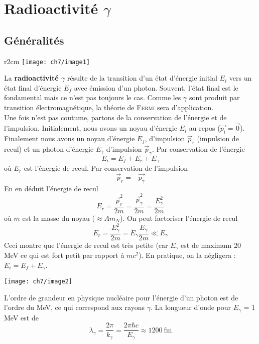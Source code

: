 \chapter{Radioactivité $\gamma$}
\section{Généralités}
	\begin{wrapfigure}[9]{r}{2cm}
	\vspace{-15mm}
	\texttt{[image: ch7/image1]}
	\end{wrapfigure}
La \textbf{radioactivité $\gamma$} résulte de la transition d'un état d'énergie initial $E_i$ vers un état final
d'énergie $E_f$ avec émission d'un photon. Souvent, l'état final est le fondamental mais ce n'est pas toujours
le cas. Comme les $\gamma$ sont produit par transition électromagnétique, la théorie de \textsc{Fermi} sera 
d'application.\\
 
 
Une fois n'est pas coutume, partons de la conservation de l'énergie et de l'impulsion. Initialement, 
nous avons un noyau d'énergie $E_i$ au repos ($\vec{p_i}=\vec 0$). Finalement nous avons un noyau 
d'énergie $E_f$, d'impulsion $\vec p_r$ (impulsion de recul) et un photon d'énergie $E_\gamma$ 
d'impulsion $\vec p_\gamma$. Par conservation de l'énergie
\begin{equation}
E_i = E_f+E_r+E_\gamma
\end{equation}
où $E_r$ est l'énergie de recul. Par conservation de l'impulsion
\begin{equation}
\vec p_r = -\vec{p_\gamma}
\end{equation}
En en déduit l'énergie de recul
\begin{equation}
E_r = \dfrac{\vec p_r^2}{2m} = \dfrac{\vec p_\gamma^2}{2m} = \dfrac{E_\gamma^2}{2m}
\end{equation}
où $m$ est la masse du noyau ($\approx Am_N$). On peut factoriser l'énergie de recul
\begin{equation}
E_r =\dfrac{E_\gamma^2}{2m} = E_\gamma\dfrac{E_\gamma}{2m}\ll E_\gamma
\end{equation}
Ceci montre que l'énergie de recul est très petite (car $E_\gamma$ est de maximum 20 MeV ce qui
est fort petit par rapport à $mc^2$). En pratique, on la négligera : $E_i = E_f+E_\gamma$.
 
\begin{center}
	\texttt{[image: ch7/image2]}
\end{center}
L'ordre de grandeur en physique nucléaire pour l'énergie d'un photon est de l'ordre du MeV, ce qui 
correspond aux rayons $\gamma$.  La longueur d'onde pour $E_\gamma$ = 1 MeV est de
\begin{equation}
\lambda_\gamma = \frac{2\pi}{k_\gamma} = \frac{2\pi \hbar c}{E_\gamma} \approx 1200\ \text{fm}
\end{equation}


